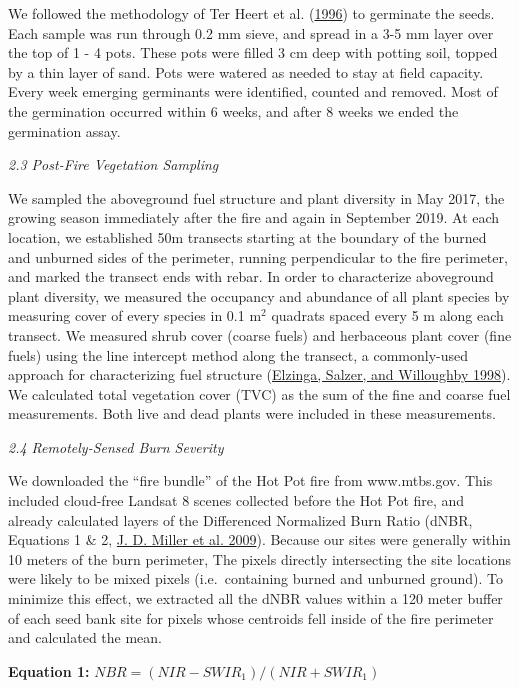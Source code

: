 \documentclass[
  12pt,
]{article}
\begin{document}
We followed the methodology of Ter Heert et al.
(\protect\hyperlink{ref-Heerdt1996}{1996}) to germinate the seeds. Each
sample was run through 0.2 mm sieve, and spread in a 3-5 mm layer over
the top of 1 - 4 pots. These pots were filled 3 cm deep with potting
soil, topped by a thin layer of sand. Pots were watered as needed to
stay at field capacity. Every week emerging germinants were identified,
counted and removed. Most of the germination occurred within 6 weeks,
and after 8 weeks we ended the germination assay.

\emph{2.3 Post-Fire Vegetation Sampling}

We sampled the aboveground fuel structure and plant diversity in May
2017, the growing season immediately after the fire and again in
September 2019. At each location, we established 50m transects starting
at the boundary of the burned and unburned sides of the perimeter,
running perpendicular to the fire perimeter, and marked the transect
ends with rebar. In order to characterize aboveground plant diversity,
we measured the occupancy and abundance of all plant species by
measuring cover of every species in 0.1 m\(^2\) quadrats spaced every 5
m along each transect. We measured shrub cover (coarse fuels) and
herbaceous plant cover (fine fuels) using the line intercept method
along the transect, a commonly-used approach for characterizing fuel
structure (\protect\hyperlink{ref-Elzinga1998}{Elzinga, Salzer, and
Willoughby 1998}). We calculated total vegetation cover (TVC) as the sum
of the fine and coarse fuel measurements. Both live and dead plants were
included in these measurements.

\emph{2.4 Remotely-Sensed Burn Severity}

We downloaded the ``fire bundle'' of the Hot Pot fire from www.mtbs.gov.
This included cloud-free Landsat 8 scenes collected before the Hot Pot
fire, and already calculated layers of the Differenced Normalized Burn
Ratio (dNBR, Equations 1 \& 2, \protect\hyperlink{ref-Miller2009}{J. D.
Miller et al. 2009}). Because our sites were generally within 10 meters
of the burn perimeter, The pixels directly intersecting the site
locations were likely to be mixed pixels (i.e.~containing burned and
unburned ground). To minimize this effect, we extracted all the dNBR
values within a 120 meter buffer of each seed bank site for pixels whose
centroids fell inside of the fire perimeter and calculated the mean.

\textbf{Equation 1:} \(NBR = (NIR-SWIR_1)/(NIR+SWIR_1)\)
\end{document}
